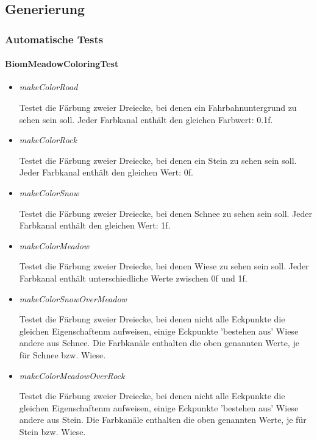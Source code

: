 \subsection{Generierung}

\subsubsection{Automatische Tests}
\paragraph{BiomMeadowColoringTest}
\begin{itemize}
    \item \textit{makeColorRoad}
        \begin{leftbar}[0.9\linewidth]
			Testet die Färbung zweier Dreiecke, bei denen ein Fahrbahnuntergrund zu sehen sein soll.
			Jeder Farbkanal enthält den gleichen Farbwert: 0.1f.
		\end{leftbar}
		
	\item \textit{makeColorRock}
        \begin{leftbar}[0.9\linewidth]
			Testet die Färbung zweier Dreiecke, bei denen ein Stein zu sehen sein soll.
			Jeder Farbkanal enthält den gleichen Wert: 0f.
		\end{leftbar}
		
	\item \textit{makeColorSnow}
        \begin{leftbar}[0.9\linewidth]
            Testet die Färbung zweier Dreiecke, bei denen Schnee zu sehen sein soll.
			Jeder Farbkanal enthält den gleichen Wert: 1f.
		\end{leftbar}
		
	\item \textit{makeColorMeadow}
		\begin{leftbar}[0.9\linewidth]
			Testet die Färbung zweier Dreiecke, bei denen Wiese zu sehen sein soll.
			Jeder Farbkanal enthält unterschiedliche Werte zwischen 0f und 1f.
		\end{leftbar}

	\item \textit{makeColorSnowOverMeadow}
        \begin{leftbar}[0.9\linewidth]
			Testet die Färbung zweier Dreiecke, bei denen nicht alle Eckpunkte die gleichen Eigenschaftenm aufweisen,
			einige Eckpunkte 'bestehen aus' Wiese andere aus Schnee.
			Die Farbkanäle enthalten die oben genannten Werte, je für Schnee bzw. Wiese.
		\end{leftbar}
		
	\item \textit{makeColorMeadowOverRock}
        \begin{leftbar}[0.9\linewidth]
			Testet die Färbung zweier Dreiecke, bei denen nicht alle Eckpunkte die gleichen Eigenschaftenm aufweisen,
			einige Eckpunkte 'bestehen aus' Wiese andere aus Stein.
			Die Farbkanäle enthalten die oben genannten Werte, je für Stein bzw. Wiese.
        \end{leftbar}
\end{itemize}

